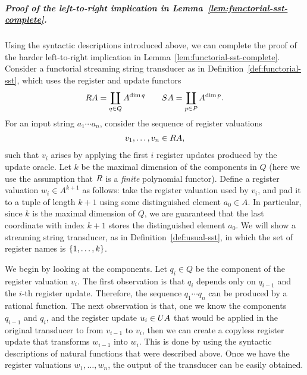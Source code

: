 \subparagraph*{Proof of the left-to-right implication in Lemma~\ref{lem:functorial-sst-complete}.} Using the syntactic descriptions introduced above, we can complete the proof of the harder left-to-right implication in Lemma~\ref{lem:functorial-sst-complete}. Consider a functorial streaming string transducer as in Definition~\ref{def:functorial-sst}, which uses the register and update functors 
\begin{align*} 
\functorr A = \coprod_{q \in Q} A^{\dim q} \qquad 
\functors A = \coprod_{p \in P} A^{\dim p}.
\end{align*}
For an input string $a_1 \cdots a_n$, consider the sequence of register valuations 
\begin{align*}
v_1,\ldots,v_n \in \functorr A,
\end{align*}
such that $v_i$ arises by applying the first $i$ register updates produced by the update oracle. Let $k$ be the maximal dimension of the components in $Q$ (here we use the assumption that $\functorr$ is a \emph{finite} polynomial functor). Define a register valuation $w_i \in A^{k+1}$ as follows: take the register valuation used by $v_i$, and pad it to a tuple of length  $k+1$ using some distinguished element $a_0 \in A$. In particular, since $k$ is the maximal dimension of $Q$, we are guaranteed that the last coordinate with index $k+1$ stores the distinguished element $a_0$. We will show a streaming string transducer, as in Definition~\ref{def:usual-sst}, in which the set of register names is $\{1,\ldots,k\}$. 

We begin by looking at the components.  Let $q_i \in Q$ be the component of the register valuation $v_i$. The first observation is that $q_i$ depends only on $q_{i-1}$ and the $i$-th register update. Therefore, the sequence $q_1 \cdots q_n$ can be produced by a rational function. The next observation is that, one we know the components $q_{i-1}$ and $q_{i}$, and the register update $u_i \in \functoru A$ that would be applied in the original transducer to from $v_{i-1}$ to $v_i$, then we can create a copyless register update that transforms $w_{i-1}$ into $w_i$. This is done by using the syntactic descriptions of natural functions that were described above. Once we have the register valuations $w_1,\ldots,w_n$, the output of the transducer can be easily obtained.

